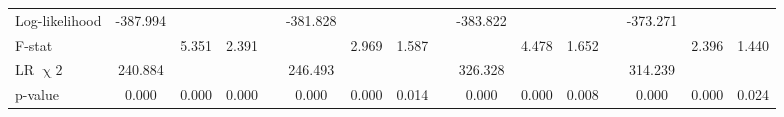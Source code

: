 {\begin{longtable}{@{\extracolsep{\fill}}lccccccccccccccc}
    Log-likelihood & -387.994 &   &   &   & -381.828 &   &   &   & -383.822 &   &   &   & -373.271 &   &  \\
    F-stat &   & 5.351 & 2.391 &   &   & 2.969 & 1.587 &   &   & 4.478 & 1.652 &   &   & 2.396 & 1.440 \\
    LR $\upchi2$ & 240.884 &   &   &   & 246.493 &   &   &   & 326.328 &   &   &   & 314.239 &   &  \\
    p-value & 0.000 & 0.000 & 0.000 &   & 0.000 & 0.000 & 0.014 &   & 0.000 & 0.000 & 0.008 &   & 0.000 & 0.000 & 0.024 \\
    \bottomrule
    \end{longtable}%
}